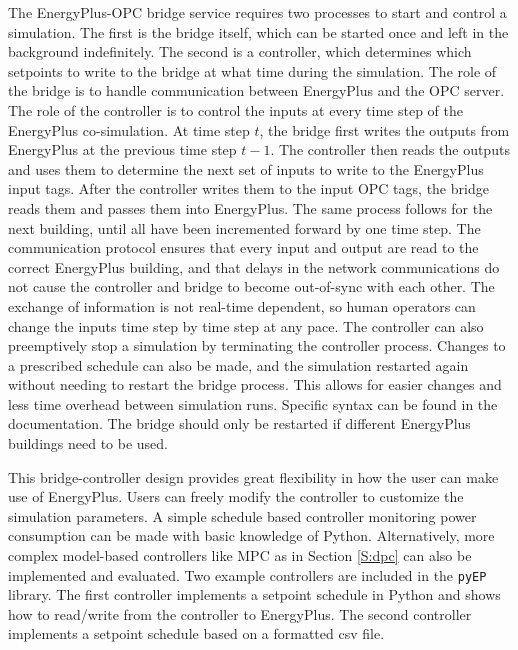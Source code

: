 The EnergyPlus-OPC bridge service requires two processes to start and control a simulation. 
The first is the bridge itself, which can be started once and left in the background indefinitely. 
The second is a controller, which determines which setpoints to write to the bridge at what time during the simulation. 
The role of the bridge is to handle communication between EnergyPlus and the OPC server. 
The role of the controller is to control the inputs at every time step of the EnergyPlus co-simulation.
At time step $t$, the bridge first writes the outputs from EnergyPlus at the previous time step $t-1$. 
The controller then reads the outputs and uses them to determine the next set of inputs to write to the EnergyPlus input tags. 
After the controller writes them to the input OPC tags, the bridge reads them and passes them into EnergyPlus. 
The same process follows for the next building, until all have been incremented forward by one time step.
The communication protocol ensures that every input and output are read to the correct EnergyPlus building, and that delays in the network communications do not cause the controller and bridge to become out-of-sync with each other. 
The exchange of information is not real-time dependent, so human operators can change the inputs time step by time step at any pace. 
The controller can also preemptively stop a simulation by terminating the controller process. 
Changes to a prescribed schedule can also be made, and the simulation restarted again without needing to restart the bridge process. 
This allows for easier changes and less time overhead between simulation runs.
Specific syntax can be found in the documentation. 
The bridge should only be restarted if different EnergyPlus buildings need to be used.

This bridge-controller design provides great flexibility in how the user can make use of EnergyPlus. 
Users can freely modify the controller to customize the simulation parameters. 
A simple schedule based controller monitoring power consumption can be made with basic knowledge of Python. 
Alternatively, more complex model-based controllers like MPC as in Section \ref{S:dpc} can also be implemented and evaluated.
Two example controllers are included in the \texttt{pyEP} library. 
The first controller implements a setpoint schedule in Python and shows how to read/write from the controller to EnergyPlus. 
The second controller implements a setpoint schedule based on a formatted csv file. 

